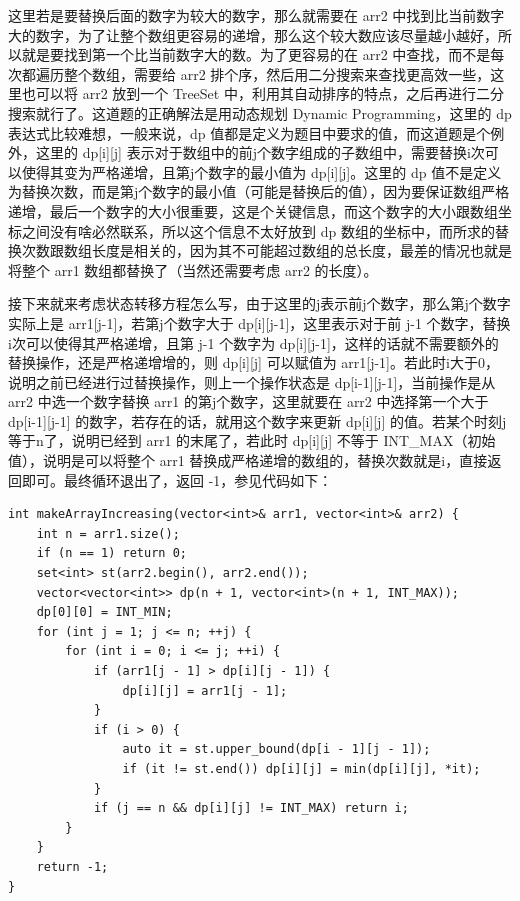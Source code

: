 \documentclass[9pt, b5paaper]{book}
\begin{document}
\begin{enumerate}
这里若是要替换后面的数字为较大的数字，那么就需要在 arr2 中找到比当前数字大的数字，为了让整个数组更容易的递增，那么这个较大数应该尽量越小越好，所以就是要找到第一个比当前数字大的数。为了更容易的在 arr2 中查找，而不是每次都遍历整个数组，需要给 arr2 排个序，然后用二分搜索来查找更高效一些，这里也可以将 arr2 放到一个 TreeSet 中，利用其自动排序的特点，之后再进行二分搜索就行了。这道题的正确解法是用动态规划 Dynamic Programming，这里的 dp 表达式比较难想，一般来说，dp 值都是定义为题目中要求的值，而这道题是个例外，这里的 dp[i][j] 表示对于数组中的前j个数字组成的子数组中，需要替换i次可以使得其变为严格递增，且第j个数字的最小值为 dp[i][j]。这里的 dp 值不是定义为替换次数，而是第j个数字的最小值（可能是替换后的值），因为要保证数组严格递增，最后一个数字的大小很重要，这是个关键信息，而这个数字的大小跟数组坐标之间没有啥必然联系，所以这个信息不太好放到 dp 数组的坐标中，而所求的替换次数跟数组长度是相关的，因为其不可能超过数组的总长度，最差的情况也就是将整个 arr1 数组都替换了（当然还需要考虑 arr2 的长度）。

接下来就来考虑状态转移方程怎么写，由于这里的j表示前j个数字，那么第j个数字实际上是 arr1[j-1]，若第j个数字大于 dp[i][j-1]，这里表示对于前 j-1 个数字，替换i次可以使得其严格递增，且第 j-1 个数字为 dp[i][j-1]，这样的话就不需要额外的替换操作，还是严格递增增的，则 dp[i][j] 可以赋值为 arr1[j-1]。若此时i大于0，说明之前已经进行过替换操作，则上一个操作状态是 dp[i-1][j-1]，当前操作是从 arr2 中选一个数字替换 arr1 的第j个数字，这里就要在 arr2 中选择第一个大于 dp[i-1][j-1] 的数字，若存在的话，就用这个数字来更新 dp[i][j] 的值。若某个时刻j等于n了，说明已经到 arr1 的末尾了，若此时 dp[i][j] 不等于 INT\_MAX（初始值），说明是可以将整个 arr1 替换成严格递增的数组的，替换次数就是i，直接返回即可。最终循环退出了，返回 -1，参见代码如下：
\begin{verbatim}
int makeArrayIncreasing(vector<int>& arr1, vector<int>& arr2) {
    int n = arr1.size();
    if (n == 1) return 0;
    set<int> st(arr2.begin(), arr2.end());
    vector<vector<int>> dp(n + 1, vector<int>(n + 1, INT_MAX));
    dp[0][0] = INT_MIN;
    for (int j = 1; j <= n; ++j) {
        for (int i = 0; i <= j; ++i) {
            if (arr1[j - 1] > dp[i][j - 1]) {
                dp[i][j] = arr1[j - 1];
            }
            if (i > 0) {
                auto it = st.upper_bound(dp[i - 1][j - 1]);
                if (it != st.end()) dp[i][j] = min(dp[i][j], *it);
            }  
            if (j == n && dp[i][j] != INT_MAX) return i;
        }
    }
    return -1;
}
\end{verbatim}
\end{enumerate}
\end{document}
